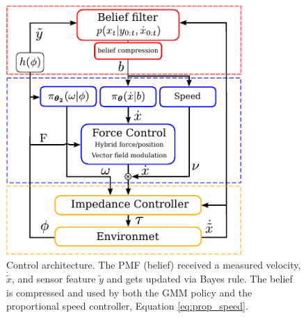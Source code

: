 \begin{figure}
  \centering
  \includegraphics[width=0.8\textwidth]{./ch4-PiH/Figures/control_flow_final.pdf}
  \caption{Control architecture. The PMF (belief) received a measured velocity, $\dot{\tilde{x}}$, and sensor feature $\tilde{y}$ and gets updated 
  via Bayes rule. The belief is compressed and used by both the GMM policy and the proportional speed controller, Equation \ref{eq:prop_speed}.}
  \label{fig:control_flow}
\end{figure}

